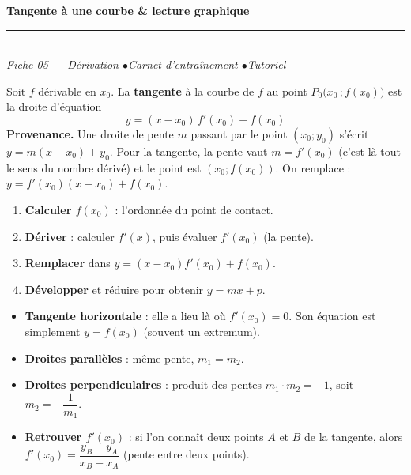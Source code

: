 \pagestyle{fancy}\fancyhf{}
\fancyfoot[C]{\small\thepage}
\renewcommand{\headrulewidth}{0.8pt}



\begin{center}
{\LARGE\bfseries\color{primarydark} Tangente à une courbe \& lecture graphique}\\[2pt]
{\color{primary}\rule{0.5\textwidth}{1.2pt}}\\[4pt]
{\small\itshape Fiche 05 — Dérivation \quad$\bullet$\quad Carnet d'entraînement \quad$\bullet$\quad Tutoriel}
\end{center}
\vspace{2mm}

\begin{cle}
Soit $f$ dérivable en $x_0$. La \textbf{tangente} à la courbe de $f$ au point $P_0\big(x_0\,;f(x_0)\big)$ est la droite d'équation
\[
\boxed{\,y=(x-x_0)\,f'(x_0)+f(x_0)\,}
\]
\textbf{Provenance.} Une droite de pente $m$ passant par le point $(x_0;y_0)$ s'écrit $y=m(x-x_0)+y_0$. Pour la tangente, la pente vaut $m=f'(x_0)$ (c'est là tout le sens du nombre dérivé) et le point est $(x_0;f(x_0))$. On remplace : $y=f'(x_0)(x-x_0)+f(x_0)$.
\end{cle}

\begin{methode}
\begin{enumerate}[leftmargin=6mm,itemsep=1pt]
\item \textbf{Calculer $f(x_0)$} : l'ordonnée du point de contact.
\item \textbf{Dériver} : calculer $f'(x)$, puis évaluer $f'(x_0)$ (la pente).
\item \textbf{Remplacer} dans $y=(x-x_0)f'(x_0)+f(x_0)$.
\item \textbf{Développer} et réduire pour obtenir $y=mx+p$.
\end{enumerate}
\end{methode}

\begin{cle}
\begin{itemize}[leftmargin=6mm,itemsep=1pt]
\item \textbf{Tangente horizontale} : elle a lieu là où $f'(x_0)=0$. Son équation est simplement $y=f(x_0)$ (souvent un extremum).
\item \textbf{Droites parallèles} : même pente, $m_1=m_2$.
\item \textbf{Droites perpendiculaires} : produit des pentes $m_1\cdot m_2=-1$, soit $m_2=-\dfrac{1}{m_1}$.
\item \textbf{Retrouver $f'(x_0)$} : si l'on connaît deux points $A$ et $B$ de la tangente, alors $f'(x_0)=\dfrac{y_B-y_A}{x_B-x_A}$ (pente entre deux points).
\end{itemize}
\end{cle}

